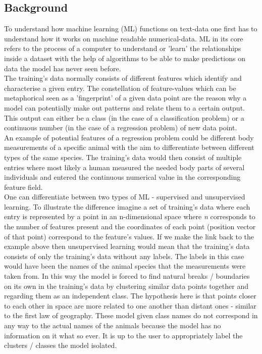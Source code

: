 \subsection{Background}
To understand how machine learning (ML) functions on text-data one first has to understand how it works on machine readable numerical-data. ML in its core refers to the process of a computer to understand or 'learn' the relationships inside a dataset with the help of algorithms to be able to make predictions on data the model has never seen before. \\
The training's data normally consists of different features which identify and characterise a given entry. The constellation of feature-values which can be metaphorical seen as a 'fingerprint' of a given data point are the reason why a model can potentially make out patterns and relate them to a certain output. This output can either be a class (in the case of a classification problem) or a continuous number (in the case of a regression problem) of new data point. \\
An example of potential features of a regression problem could be different body measurements of a specific animal with the aim to differentiate between different types of the same species. The training's data would then consist of multiple entries where most likely a human measured the needed body parts of several individuals and entered the continuous numerical value in the corresponding feature field.\\
\newline
One can differentiate between two types of ML - supervised and unsupervised learning. To illustrate the difference imagine a set of training's data where each entry is represented by a point in an n-dimensional space where \textit{n} corresponds to the number of features present and the coordinates of each point (position vector of that point) correspond to the feature's values. If we make the link back to the example above then unsupervised learning would mean that the training's data consists of only the training's data without any labels. The labels in this case would have been the names of the animal species that the measurements were taken from. In this way the model is forced to find natural breaks / boundaries on its own in the training's data by clustering similar data points together and regarding them as an independent class. The hypothesis here is that points closer to each other in space are more related to one another than distant ones - similar to the first law of geography. These model given class names do not correspond in any way to the actual names of the animals because the model has no information on it what so ever. It is up to the user to appropriately label the clusters / classes the model isolated. \\

